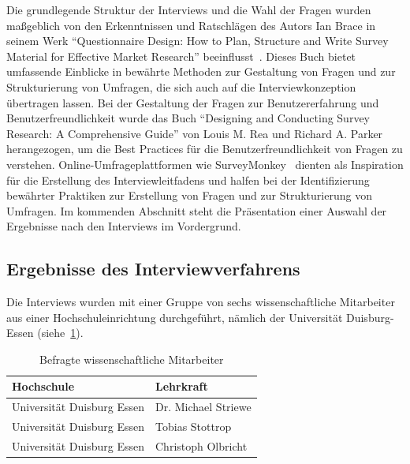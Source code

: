 Die grundlegende Struktur der Interviews und die Wahl der Fragen wurden maßgeblich von den Erkenntnissen und Ratschlägen
des Autors Ian Brace in seinem Werk ``Questionnaire Design: How to Plan, Structure and Write Survey Material for
Effective Market Research'' beeinflusst~\cite{brace2018questionnaire}. Dieses Buch bietet umfassende Einblicke in
bewährte Methoden zur Gestaltung von Fragen und zur Strukturierung von Umfragen, die sich auch auf die
Interviewkonzeption übertragen lassen. Bei der Gestaltung der Fragen zur Benutzererfahrung und Benutzerfreundlichkeit
wurde das Buch ``Designing and Conducting Survey Research: A Comprehensive Guide'' von Louis M. Rea und Richard
A. Parker~\cite{rea2014designing} herangezogen, um die Best Practices für die Benutzerfreundlichkeit von Fragen zu
verstehen. Online-Umfrageplattformen wie SurveyMonkey~\cite{monkey} dienten als Inspiration für die Erstellung des
Interviewleitfadens und halfen bei der Identifizierung bewährter Praktiken zur Erstellung von Fragen und zur
Strukturierung von Umfragen. Im kommenden Abschnitt steht die Präsentation einer Auswahl der Ergebnisse nach den
Interviews im Vordergrund.


\subsection{Ergebnisse des Interviewverfahrens}

Die Interviews wurden mit einer Gruppe von sechs wissenschaftliche Mitarbeiter aus einer Hochschuleinrichtung
durchgeführt, nämlich der Universität Duisburg-Essen (siehe~\ref{tab:personnen}).

\begin{table}
    \centering
    \caption{Befragte wissenschaftliche Mitarbeiter} \label{tab:personnen}
    \begin{adjustbox}{scale=0.9}
        \begin{tabular}{ll}
            \toprule
            \textbf{Hochschule} & \textbf{Lehrkraft} \\
            \midrule
            Universität Duisburg Essen & Dr. Michael Striewe \\
            \midrule
            Universität Duisburg Essen & Tobias Stottrop \\
            \midrule
            Universität Duisburg Essen & Christoph Olbricht \\
            \bottomrule
        \end{tabular}
    \end{adjustbox}
\end{table}

